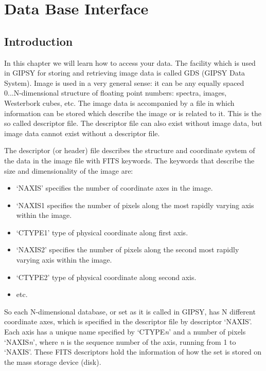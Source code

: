 \chapter{Data Base Interface}

\section{Introduction}

In this chapter we will learn how to access your data.  The facility
which is used in GIPSY for storing and retrieving image data is called
GDS (GIPSY Data System).  Image is used in a very general sense: it can
be any equally spaced 0...N-dimensional structure of floating point
numbers: spectra, images, Westerbork cubes, etc.  The image data is
accompanied by a file in which information can be stored which describe
the image or is related to it.  This is the so called descriptor file.
The descriptor file can also exist without image data, but image data
cannot exist without a descriptor file.

The descriptor (or header) file describes the structure and coordinate
system of the data in the image file with FITS keywords.  The keywords
that describe the size and dimensionality of the image are:

\begin{itemize}

\item `NAXIS' specifies the number of coordinate axes in the image.

\item `NAXIS1 specifies the number of pixels along the most rapidly
varying axis within the image.

\item `CTYPE1' type of physical coordinate along first axis.

\item `NAXIS2' specifies the number of pixels along the second most
rapidly varying axis within the image.

\item `CTYPE2' type of physical coordinate along second axis.

\item etc.

\end{itemize}

\noindent So each N-dimensional database, or set as it is called in
GIPSY, has N different coordinate axes, which is specified in the
descriptor file by descriptor `NAXIS'.  Each axis has a unique name
specified by `CTYPE{\it n}' and a number of pixels `NAXIS{\it n}', where
{\it n} is the sequence number of the axis, running from 1 to `NAXIS'.
These FITS descriptors hold the information of how the set is stored on
the mass storage device (disk).

